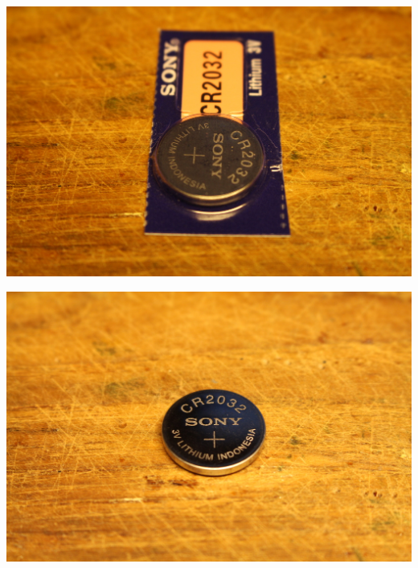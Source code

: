 \documentclass{article}
\begin{document}
\begin{minipage}[b]{0.5\textwidth}
	\includegraphics[width=\textwidth]{Bilder2021/IMG_8171.JPG}
\end{minipage}
\begin{minipage}[b]{0.5\textwidth}
	\includegraphics[width=\textwidth]{Bilder2021/IMG_8172.JPG}
\end{minipage}

\vspace{0.5cm}
\end{document}
